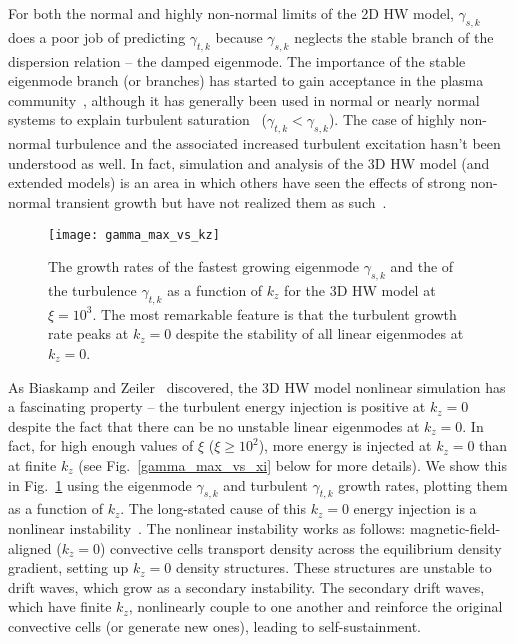 \documentclass[twocolumn,showkeys,superscriptaddress]{revtex4}
\begin{document}
For both the normal and highly non-normal limits of the 2D HW model, $\gamma_{s,k}$ does a poor job of predicting $\gamma_{t,k}$ because $\gamma_{s,k}$ neglects the stable branch of the
dispersion relation -- the damped eigenmode. The importance of the stable eigenmode branch (or branches) 
has started to gain acceptance in the plasma community~\cite{baver2002}, although it has generally been used in normal
or nearly normal systems to explain turbulent saturation~\cite{terry2006b,hatch2011,makwana2011} ($\gamma_{t,k} < \gamma_{s,k}$). 
The case of highly non-normal turbulence and the associated increased turbulent excitation hasn't been understood as well. 
In fact, simulation and analysis of the 3D HW model (and extended models) is an area in which others have seen the effects of strong non-normal transient growth
but have not realized them as such~\cite{biskamp1995,drake1995,scott2002,scott2005,umansky2009,friedman2012b}.

\begin{figure}
\centerline{\texttt{[image: gamma\_max\_vs\_kz]}}
\caption{The growth rates of the fastest growing eigenmode $\gamma_{s,k}$ and the of the turbulence $\gamma_{t,k}$ as a function of $k_z$ for the 3D HW model at $\xi = 10^3$. The most remarkable feature is
that the turbulent growth rate peaks at $k_z=0$ despite the stability of all linear eigenmodes at $k_z=0$.}
\label{gamma_max_vs_kz}
\end{figure}

As Biaskamp and Zeiler~\cite{biskamp1995} discovered, the 3D HW model nonlinear simulation has a fascinating property -- 
the turbulent energy injection is positive at $k_z = 0$ despite the fact that there can be no unstable linear eigenmodes at $k_z=0$.
In fact, for high enough values of $\xi$ ($\xi \ge 10^2$), more energy is injected at $k_z = 0$ than at finite $k_z$ (see Fig.~\ref{gamma_max_vs_xi} below for more details).
We show this in Fig.~\ref{gamma_max_vs_kz} using the eigenmode $\gamma_{s,k}$ and turbulent $\gamma_{t,k}$ growth rates, plotting them as a function of $k_z$.
The long-stated cause of this $k_z=0$ energy injection is a nonlinear instability~\cite{biskamp1995,drake1995}. 
The nonlinear instability works as follows: magnetic-field-aligned ($k_z=0$) convective cells transport density across the equilibrium density gradient, setting up $k_z=0$ density structures. 
These structures are unstable to drift waves, which grow as a secondary instability.
The secondary drift waves, which have finite $k_z$, nonlinearly couple to one another and reinforce the original convective cells (or generate new ones), leading to self-sustainment.
\end{document}
